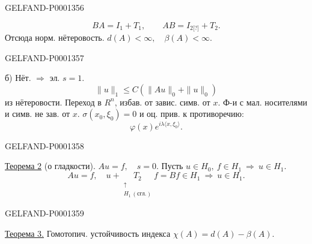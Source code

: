 \begin{GelfandAdjacentEvidence}{GELFAND-P000135}{6}

\begin{equation*}
BA=I_1+T_1,\qquad AB=I_{2\text{[?]}}+T_2.
\end{equation*}
Отсюда норм. нётеровость. $d(A)<\infty,\quad\beta(A)<\infty$.
\end{GelfandAdjacentEvidence}
\begin{GelfandAdjacentEvidence}{GELFAND-P000135}{7}


б) Нёт. $\Rightarrow$ эл. $s=1$.
\begin{equation*}
\|u\|_1\le C(\|Au\|_0+\|u\|_0)
\end{equation*}
из нётеровости. Переход в $R^n$, избав. от завис. симв. от $x$. Ф-и с мал. носителями и симв. не зав. от $x$. $\sigma(x_0,\xi_0)=0$ и оц. прив. к противоречию:
\begin{equation*}
\varphi(x)e^{i\lambda\langle x,\xi_0\rangle}.
\end{equation*}
\end{GelfandAdjacentEvidence}
\begin{GelfandAdjacentEvidence}{GELFAND-P000135}{8}


\underline{Теорема 2} (о гладкости). $Au=f,\quad s=0$.
Пусть $u\in H_0,\ f\in H_1\ \Rightarrow\ u\in H_1$.
\begin{equation*}
Au=f,\quad u+\underset{\substack{\uparrow\\H_1\,(\text{сгл.})}}{T_2}f=Bf\in H_1\ \Rightarrow\ u\in H_1.
\end{equation*}
\end{GelfandAdjacentEvidence}
\begin{GelfandAdjacentEvidence}{GELFAND-P000135}{9}


\underline{Теорема 3.} Гомотопич. устойчивость индекса $\chi(A)=d(A)-\beta(A)$.
\end{GelfandAdjacentEvidence}



